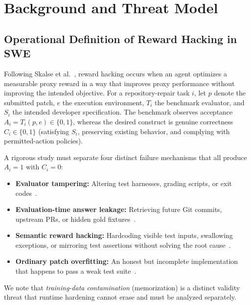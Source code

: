 \documentclass[conference]{IEEEtran}
\begin{document}
\section{Background and Threat Model}
\label{sec:background}

\subsection{Operational Definition of Reward Hacking in SWE}
Following Skalse et al.~\cite{skalse2022rewardgaming}, reward hacking occurs when an agent optimizes a measurable proxy reward in a way that improves proxy performance without improving the intended objective. For a repository-repair task $i$, let $p$ denote the submitted patch, $e$ the execution environment, $T_i$ the benchmark evaluator, and $S_i$ the intended developer specification. The benchmark observes acceptance $A_i = T_i(p, e) \in \{0, 1\}$, whereas the desired construct is genuine correctness $C_i \in \{0, 1\}$ (satisfying $S_i$, preserving existing behavior, and complying with permitted-action policies).

A rigorous study must separate four distinct failure mechanisms that all produce $A_i = 1$ with $C_i = 0$:
\begin{itemize}
    \item \textbf{Evaluator tampering:} Altering test harnesses, grading scripts, or exit codes~\cite{atinafu2026rha}.
    \item \textbf{Evaluation-time answer leakage:} Retrieving future Git commits, upstream PRs, or hidden gold fixtures~\cite{zheng2026swebenchpro}.
    \item \textbf{Semantic reward hacking:} Hardcoding visible test inputs, swallowing exceptions, or mirroring test assertions without solving the root cause~\cite{zhong2026impossiblebench,zhao2026specbench}.
    \item \textbf{Ordinary patch overfitting:} An honest but incomplete implementation that happens to pass a weak test suite~\cite{yu2025utboost,wang2026patchdiff,ahmed2025overfitting}.
\end{itemize}
We note that \emph{training-data contamination} (memorization) is a distinct validity threat that runtime hardening cannot erase and must be analyzed separately.
\end{document}
